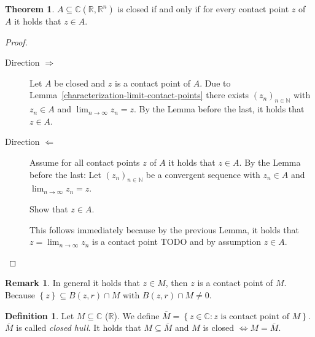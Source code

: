 \documentclass[a4paper,landscape,twocolumn]{article}
\theoremstyle{definition}
\newtheorem{theorem}{Theorem}
\newtheorem{defi}{Definition}
\newtheorem{rem}{Remark}
\newcommand\set[1]{\left\{#1\right\}}
\newcommand\seq[1]{{\left(#1\right)}_{n \in \mathbb N}}
\begin{document}
\begin{theorem}
  $A \subseteq \mathbb C (\mathbb R, \mathbb R^n)$ is closed if and only if
  for every contact point $z$ of $A$ it holds that $z \in A$.
\end{theorem}
\begin{proof}
  \begin{description}
    \item[Direction $\Rightarrow$]
      Let $A$ be closed and $z$ is a contact point of $A$.
      Due to Lemma~\ref{characterization-limit-contact-points} there exists $\seq{z_n}$
      with $z_n \in A$ and $\lim_{n\to\infty} z_n = z$.
      By the Lemma before the last, it holds that $z \in A$.
    \item[Direction $\Leftarrow$]
      Assume for all contact points $z$ of $A$ it holds that $z \in A$.
      By the Lemma before the last: Let $\seq{z_n}$ be a convergent sequence with
      $z_n \in A$ and $\lim_{n\to\infty} z_n = z$.

      Show that $z \in A$.

      This follows immediately because by the previous Lemma, it holds that
      $z = \lim_{n\to\infty} z_n$ is a contact point TODO
      and by assumption $z \in A$.
  \end{description}
\end{proof}
\begin{rem}
  In general it holds that $z \in M$, then $z$ is a contact point of $M$.
  Because $\set{z} \subseteq B(z, r) \cap M$ with $B(z, r) \cap M \neq 0$.
\end{rem}
\begin{defi}
  Let $M \subseteq \mathbb C$ ($\mathbb R$).
  We define $\overline{M} = \set{z \in \mathbb C: z \text{ is contact point of } M}$.
  $\overline{M}$ is called \emph{closed hull}.
  It holds that $M \subseteq \overline{M}$ and $M$ is closed
  $\Leftrightarrow M = \overline{M}$.
\end{defi}
\end{document}
